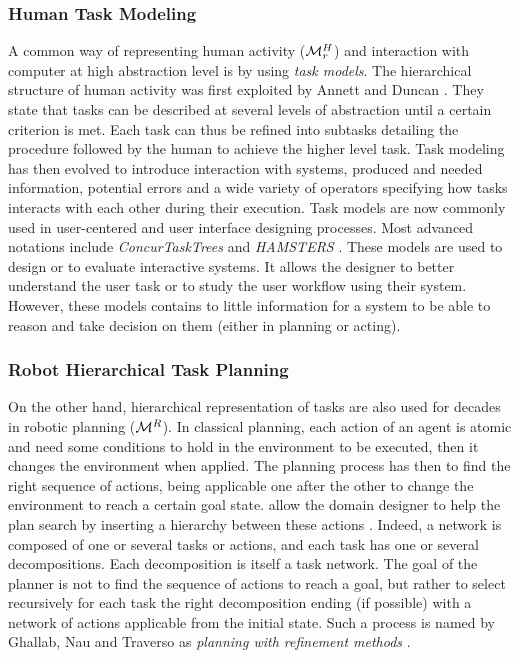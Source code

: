 \documentclass[a4paper,11pt,twoside]{StyleThese}
\begin{document}
\subsubsection{Human Task Modeling}
A common way of representing human activity ($\mathcal{M}^H_r$) and interaction with computer at high abstraction level is by using \textit{task models}. The hierarchical structure of human activity was first exploited by Annett and Duncan \cite{annett1967task}. They state that tasks can be described at several levels of abstraction until a certain criterion is met. Each task can thus be refined into subtasks detailing the procedure followed by the human to achieve the higher level task.
Task modeling has then evolved to introduce interaction with systems, produced and needed information, potential errors and a wide variety of operators specifying how tasks interacts with each other during their execution. Task models are now commonly used in user-centered and user interface designing processes. Most advanced notations include \textit{ConcurTaskTrees} \cite{paterno2004concurtasktrees} and \textit{HAMSTERS} \cite{martinie2019analysing}.
These models are used to design or to evaluate interactive systems. It allows the designer to better understand the user task or to study the user workflow using their system. However, these models contains to little information for a system to be able to reason and take decision on them (either in planning or acting).

\subsubsection{Robot Hierarchical Task Planning}
On the other hand, hierarchical representation of tasks are also used for decades in robotic planning ($\mathcal{M}^R$). In classical planning, each action of an agent is atomic and need some conditions to hold in the environment to be executed, then it changes the environment when applied. The planning process has then to find the right sequence of actions, being applicable one after the other to change the environment to reach a certain goal state.  allow the domain designer to help the plan search by inserting a hierarchy between these actions \cite{erol1996complexity}. Indeed, a network is composed of one or several tasks or actions, and each task has one or several decompositions. Each decomposition is itself a task network. The goal of the planner is not to find the sequence of actions to reach a goal, but rather to select recursively for each task the right decomposition ending (if possible) with a network of actions applicable from the initial state. Such a process is named by Ghallab, Nau and Traverso as \textit{planning with refinement methods} \cite{ghallab_nau_traverso_2016}.
\end{document}
